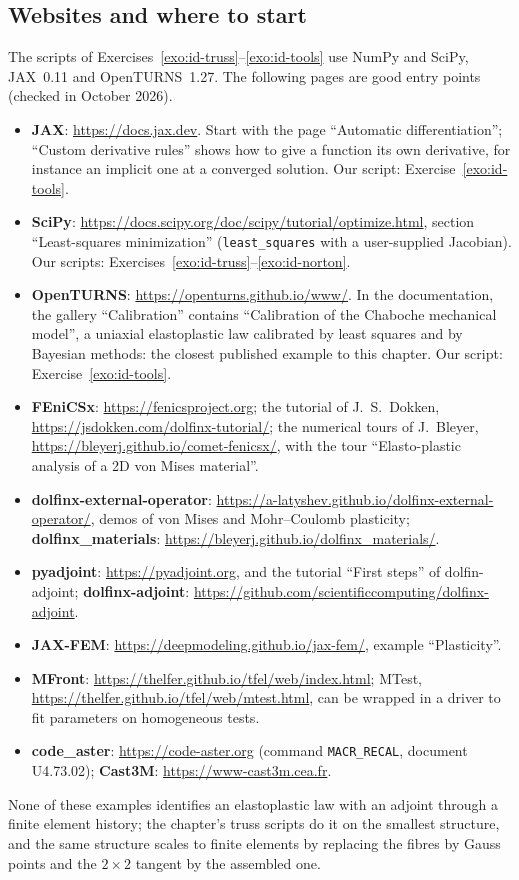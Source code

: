 \subsection{Websites and where to start}\label{ssec:id-links}
%
The scripts of Exercises~\ref{exo:id-truss}--\ref{exo:id-tools} use NumPy and
SciPy, JAX~0.11 and OpenTURNS~1.27. The following pages are good entry points
(checked in October 2026).
\begin{itemize}
  \item \textbf{JAX}: \url{https://docs.jax.dev}. Start with the page
  ``Automatic differentiation''; ``Custom derivative rules'' shows how to give a
  function its own derivative, for instance an implicit one at a converged
  solution. Our script: Exercise~\ref{exo:id-tools}.
  \item \textbf{SciPy}: \url{https://docs.scipy.org/doc/scipy/tutorial/optimize.html},
  section ``Least-squares minimization'' (\texttt{least\_squares} with a
  user-supplied Jacobian). Our scripts: Exercises~\ref{exo:id-truss}--\ref{exo:id-norton}.
  \item \textbf{OpenTURNS}: \url{https://openturns.github.io/www/}. In the
  documentation, the gallery ``Calibration'' contains ``Calibration of the
  Chaboche mechanical model'', a uniaxial elastoplastic law calibrated by least
  squares and by Bayesian methods: the closest published example to this
  chapter. Our script: Exercise~\ref{exo:id-tools}.
  \item \textbf{FEniCSx}: \url{https://fenicsproject.org}; the tutorial of
  J.~S.~Dokken, \url{https://jsdokken.com/dolfinx-tutorial/}; the numerical tours of
  J.~Bleyer, \url{https://bleyerj.github.io/comet-fenicsx/}, with the tour
  ``Elasto-plastic analysis of a 2D von Mises material''.
  \item \textbf{dolfinx-external-operator}:
  \url{https://a-latyshev.github.io/dolfinx-external-operator/}, demos of von Mises
  and Mohr--Coulomb plasticity; \textbf{dolfinx\_materials}:
  \url{https://bleyerj.github.io/dolfinx_materials/}.
  \item \textbf{pyadjoint}: \url{https://pyadjoint.org}, and the tutorial ``First
  steps'' of dolfin-adjoint; \textbf{dolfinx-adjoint}:
  \url{https://github.com/scientificcomputing/dolfinx-adjoint}.
  \item \textbf{JAX-FEM}: \url{https://deepmodeling.github.io/jax-fem/}, example
  ``Plasticity''.
  \item \textbf{MFront}: \url{https://thelfer.github.io/tfel/web/index.html}; MTest,
  \url{https://thelfer.github.io/tfel/web/mtest.html}, can be wrapped in a driver
  to fit parameters on homogeneous tests.
  \item \textbf{code\_aster}: \url{https://code-aster.org} (command
  \texttt{MACR\_RECAL}, document U4.73.02); \textbf{Cast3M}:
  \url{https://www-cast3m.cea.fr}.
\end{itemize}
None of these examples identifies an elastoplastic law with an adjoint through a
finite element history; the chapter's truss scripts do it on the smallest
structure, and the same structure scales to finite elements by replacing the
fibres by Gauss points and the $2\times2$ tangent by the assembled one.

